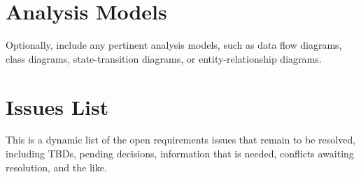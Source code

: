 \documentclass[12pt,oneside,letterpaper]{article}
\begin{document}
\section{Analysis Models}
Optionally, include any pertinent analysis models, such as data flow diagrams, class diagrams, state-transition diagrams, or entity-relationship diagrams.

\section{Issues List}
This is a dynamic list of the open requirements issues that remain to be resolved, including TBDs, pending decisions, information that is needed, conflicts awaiting resolution, and the like.
\end{document}
